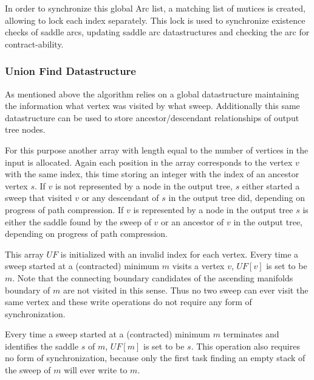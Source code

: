 \documentclass{scrartcl}
\begin{document}
In order to synchronize this global Arc list, a matching list of mutices is created, allowing to lock each index separately. This lock is used to synchronize existence checks of saddle arcs, updating saddle arc datastructures and checking the arc for contract-ability.

\subsubsection{Union Find Datastructure}
As mentioned above the algorithm relies on a global datastructure maintaining the information what vertex was visited by what sweep. Additionally this same datastructure can be used to store ancestor/descendant relationships of output tree nodes. 

For this purpose another array with length equal to the number of vertices in the input is allocated. Again each position in the array corresponds to the vertex \(v\) with the same index, this time storing an integer with the index of an ancestor vertex \(s\). If \(v\) is not represented by a node in the output tree, \(s\) either started a sweep that visited \(v\) or any descendant of \(s\) in the output tree did, depending on progress of path compression. If \(v\) is represented by a node in the output tree \(s\) is either the saddle found by the sweep of \(v\) or an ancestor of \(v\) in the output tree, depending on progress of path compression. 

This array \(UF\) is initialized with an invalid index for each vertex. Every time a sweep started at a (contracted) minimum \(m\) visits a vertex \(v\), \(UF[v]\) is set to be \(m\). Note that the connecting boundary candidates of the ascending manifolds boundary of \(m\) are not visited in this sense. Thus no two sweep can ever visit the same vertex and these write operations do not require any form of synchronization. 

Every time a sweep started at a (contracted) minimum \(m\) terminates and identifies the saddle \(s\) of \(m\), \(UF[m]\) is set to be \(s\). This operation also requires no form of synchronization, because only the first task finding an empty stack of the sweep of \(m\) will ever write to \(m\).
\end{document}
